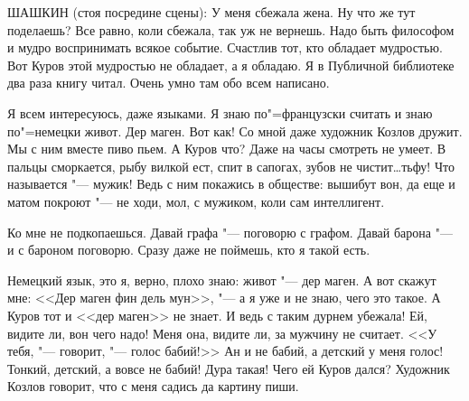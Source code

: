 ШАШКИН  (стоя посредине сцены):  У  меня
сбежала жена. Ну что же  тут поделаешь?  Все
равно, коли сбежала, так уж не вернешь. Надо
быть философом и мудро  воспринимать  всякое
событие. Счастлив тот,  кто обладает  мудростью. Вот Куров этой мудростью  не обладает,
а  я  обладаю.  Я в Публичной библиотеке два
раза  книгу читал. Очень  умно там обо  всем
написано.

    Я всем интересуюсь, даже языками. Я знаю
по"=французски считать и знаю по"=немецки  живот. Дер маген. Вот как! Со мной даже художник  Козлов  дружит.  Мы  с  ним вместе пиво
пьем. А Куров что? Даже на часы  смотреть не
умеет. В пальцы сморкается, рыбу вилкой ест,
спит в сапогах, зубов не чистит\dots тьфу! Что
называется "--- мужик!  Ведь с ним  покажись  в
обществе: вышибут вон, да еще и матом покроют  "---  не ходи, мол, с мужиком, коли сам интеллигент.

    Ко  мне не подкопаешься.  Давай графа  "---
поговорю с графом. Давай барона  "--- и с бароном поговорю. Сразу даже не поймешь,  кто  я
такой есть.

    Немецкий язык, это я, верно, плохо знаю:
живот "--- дер маген.  А вот  скажут мне:  <<Дер
маген фин дель мун>>,  "---  а  я уже и не знаю,
чего это такое. А Куров тот и <<дер маген>> не
знает.  И ведь с таким дурнем  убежала!  Ей,
видите ли, вон чего надо!  Меня она,  видите
ли, за мужчину не считает. <<У тебя, "---  говорит, "--- голос бабий!>> Ан и не бабий,  а  детский у меня голос!  Тонкий, детский, а вовсе
не бабий!  Дура такая!  Чего ей Куров дался?
Художник  Козлов говорит,  что с меня садись
да картину пиши.

